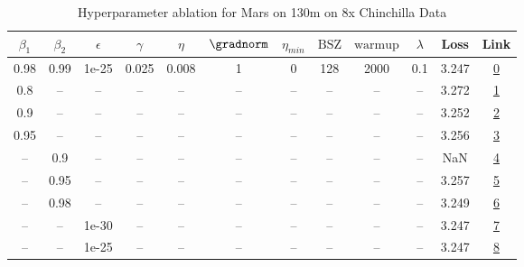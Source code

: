 \begin{table}[H]
\centering
\caption{Hyperparameter ablation for Mars on 130m on 8x Chinchilla Data}
\label{tab:ablation_mars_130m_on_8x_chinchilla_data}
\begin{tabular}{cccccccccccc}
\toprule
$\beta_1$ & $\beta_2$ & $\epsilon$ & $\gamma$ & $\eta$ & $\gradnorm$ & $\eta_{min}$ & $\mathrm{BSZ}$ & $\mathrm{warmup}$ & $\lambda$ & Loss & Link \\
\midrule
0.98 & 0.99 & 1e-25 & 0.025 & 0.008 & 1 & 0 & 128 & 2000 & 0.1 & 3.247 & \href{https://wandb.ai/stanford-mercury/optimizer-scaling/runs/sweep-130m-21B-marse0bd33lr0.008-wd0.1-minlr0-warmup2000-b10.98--8e8f56}{0} \\
\midrule
0.8 & -- & -- & -- & -- & -- & -- & -- & -- & -- & 3.272 & \href{https://wandb.ai/stanford-mercury/optimizer-scaling/runs/sweep-130m-21B-marsf4b9a3lr0.008-wd0.1-minlr0-warmup2000-b10.8-b-7720d7}{1} \\
0.9 & -- & -- & -- & -- & -- & -- & -- & -- & -- & 3.252 & \href{https://wandb.ai/stanford-mercury/optimizer-scaling/runs/sweep-130m-21B-marsa14b1flr0.008-wd0.1-minlr0-warmup2000-b10.9-b-3cf5ea}{2} \\
0.95 & -- & -- & -- & -- & -- & -- & -- & -- & -- & 3.256 & \href{https://wandb.ai/stanford-mercury/optimizer-scaling/runs/sweep-130m-21B-marsa2ff9clr0.008-wd0.1-minlr0-warmup2000-b10.95--2b9b91}{3} \\
-- & 0.9 & -- & -- & -- & -- & -- & -- & -- & -- & NaN & \href{https://wandb.ai/stanford-mercury/optimizer-scaling/runs/sweep-130m-21B-marsbd2446lr0.008-wd0.1-minlr0-warmup2000-b10.98--91ca7d}{4} \\
-- & 0.95 & -- & -- & -- & -- & -- & -- & -- & -- & 3.257 & \href{https://wandb.ai/stanford-mercury/optimizer-scaling/runs/sweep-130m-21B-mars958a5alr0.008-wd0.1-minlr0-warmup2000-b10.98--43c96f}{5} \\
-- & 0.98 & -- & -- & -- & -- & -- & -- & -- & -- & 3.249 & \href{https://wandb.ai/stanford-mercury/optimizer-scaling/runs/sweep-130m-21B-mars10209dlr0.008-wd0.1-minlr0-warmup2000-b10.98--beb8d7}{6} \\
-- & -- & 1e-30 & -- & -- & -- & -- & -- & -- & -- & 3.247 & \href{https://wandb.ai/stanford-mercury/optimizer-scaling/runs/sweep-130m-21B-marse0bd33lr0.008-wd0.1-minlr0-warmup2000-b10.98--8e8f56}{7} \\
-- & -- & 1e-25 & -- & -- & -- & -- & -- & -- & -- & 3.247 & \href{https://wandb.ai/stanford-mercury/optimizer-scaling/runs/sweep-130m-21B-marse0bd33lr0.008-wd0.1-minlr0-warmup2000-b10.98--8e8f56}{8} \\

\end{tabular}
\end{table}
